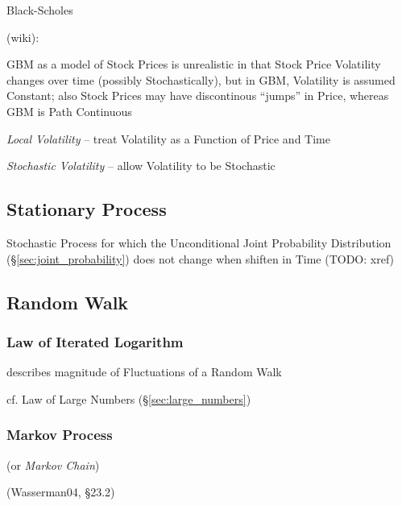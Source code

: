 Black-Scholes

(wiki):

GBM as a model of Stock Prices is unrealistic in that Stock Price Volatility
changes over time (possibly Stochastically), but in GBM, Volatility is assumed
Constant; also Stock Prices may have discontinous ``jumps'' in Price, whereas
GBM is Path Continuous

\emph{Local Volatility} -- treat Volatility as a Function of Price and Time

\emph{Stochastic Volatility} -- allow Volatility to be Stochastic



\subsection{Stationary Process}\label{sec:stationary_process}

Stochastic Process for which the Unconditional Joint Probability Distribution
(\S\ref{sec:joint_probability}) does not change when shiften in Time (TODO:
xref)



\subsection{Random Walk}\label{sec:random_walk}

\subsubsection{Law of Iterated Logarithm}\label{sec:iterated_logarithm}

describes magnitude of Fluctuations of a Random Walk

cf. Law of Large Numbers (\S\ref{sec:large_numbers})



\subsubsection{Markov Process}\label{sec:markov_process}

(or \emph{Markov Chain})

(Wasserman04, \S23.2)

